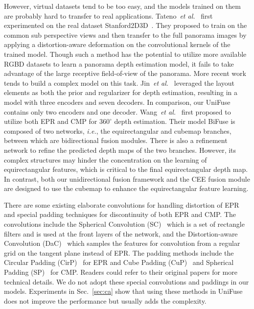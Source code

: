 \documentclass[letterpaper, 10 pt, conference]{ieeeconf}
\def\ie{\emph{i.e.}}
\def\etal{\emph{et al.}}
\begin{document}
However, virtual datasets tend to be too easy, and the models trained on them are probably hard to transfer to real applications. 
Tateno~\etal~\cite{tateno2018distortion} first experimented on the real dataset Stanford2D3D~\cite{armeni2017joint}. They proposed to train on the common sub perspective views and then transfer to the full panorama images by applying a distortion-aware deformation on the convolutional kernels of the trained model. Though such a method has the potential to utilize more available RGBD datasets to learn a panorama depth estimation model, it fails to take advantage of the large receptive field-of-view of the panorama. More recent work~\cite{jin2020geometric, wang2020bifuse} tends to build a complex model on this task. Jin~\etal~\cite{jin2020geometric} leveraged the layout elements as both the prior and regularizer for depth estimation, resulting in a model with three encoders and seven decoders. In comparison, our UniFuse contains only two encoders and one decoder. Wang~\etal~\cite{wang2020bifuse} first proposed to utilize both EPR and CMP for $360^{\circ}$ depth estimation. Their model BiFuse is composed of two networks, \ie, the equirectangular and cubemap branches, between which are bidirectional fusion modules. There is also a refinement network to refine the predicted depth maps of the two branches. 
However, its complex structures may hinder the concentration on the learning of equirectangular features, which is critical to the final equirectangular depth map. 
In contrast, both our unidirectional fusion framework and the CEE fusion module are designed to use the cubemap to enhance the equirectangular feature learning. 

{There are some existing elaborate convolutions for handling distortion of EPR and special padding techniques for discontinuity of both EPR and CMP. 
The convolutions include the Spherical Convolution (SC)~\cite{su2017learning} which is a set of rectangle filters and is used at the front layers of the network, and the Distortion-aware Convolution (DaC)~\cite{tateno2018distortion, coors2018spherenet, fernandez2020corners} which samples the features for convolution from a regular grid on the tangent plane instead of EPR. The padding methods include the Circular Padding (CirP)~\cite{wang2018omnidirectional} for EPR and Cube Padding (CuP)~\cite{cheng2018cube} and Spherical Padding (SP)~\cite{wang2020bifuse} for CMP. Readers could refer to their original papers for more technical details. We do not adopt these special convolutions and paddings in our models. Experiments in Sec.~\ref{sec:ca} show that using these methods in UniFuse does not improve the performance but usually adds the complexity.}
\end{document}
